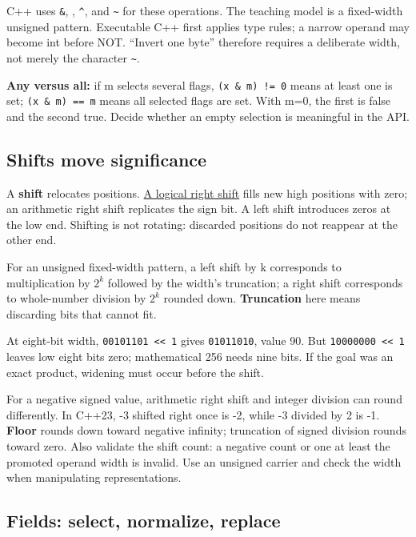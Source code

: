 C++ uses \texttt{\&}, \texttt{\textbar{}}, \texttt{\^{}}, and \texttt{\textasciitilde{}} for these operations. The teaching model is a fixed-width unsigned pattern. Executable C++ first applies type rules; a narrow operand may become int before NOT. ``Invert one byte'' therefore requires a deliberate width, not merely the character \texttt{\textasciitilde{}}.

\textbf{Any versus all:} if m selects several flags, \texttt{(x\ \&\ m)\ !=\ 0} means at least one is set; \texttt{(x\ \&\ m)\ ==\ m} means all selected flags are set. With m=0, the first is false and the second true. Decide whether an empty selection is meaningful in the API.

\subsection{Shifts move significance}\label{01-foundations-i-ch001-shifts-move-significance}

A \textbf{shift} relocates positions. \hyperref[appendix-73425b25118e]{A logical right shift} fills new high positions with zero; an arithmetic right shift replicates the sign bit. A left shift introduces zeros at the low end. Shifting is not rotating: discarded positions do not reappear at the other end.

For an unsigned fixed-width pattern, a left shift by k corresponds to multiplication by \(2^k\) followed by the width's truncation; a right shift corresponds to whole-number division by \(2^k\) rounded down. \textbf{Truncation} here means discarding bits that cannot fit.

At eight-bit width, \texttt{00101101\ \textless{}\textless{}\ 1} gives \texttt{01011010}, value 90. But \texttt{10000000\ \textless{}\textless{}\ 1} leaves low eight bits zero; mathematical 256 needs nine bits. If the goal was an exact product, widening must occur before the shift.

For a negative signed value, arithmetic right shift and integer division can round differently. In C++23, -3 shifted right once is -2, while -3 divided by 2 is -1. \textbf{Floor} rounds down toward negative infinity; truncation of signed division rounds toward zero. Also validate the shift count: a negative count or one at least the promoted operand width is invalid. Use an unsigned carrier and check the width when manipulating representations.

\subsection{Fields: select, normalize, replace}\label{01-foundations-i-ch001-fields-select-normalize-replace}

